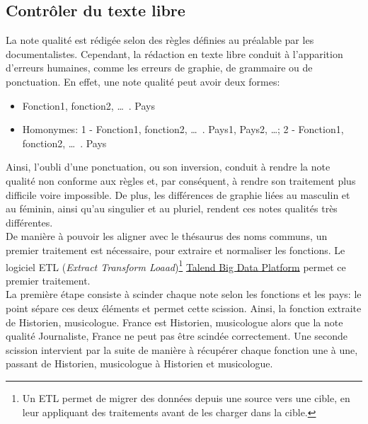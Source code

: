 \subsection{\label{I-C-3-a}Contrôler du texte libre}

La note qualité est rédigée selon des règles définies au préalable par les documentalistes. Cependant, la rédaction en texte libre conduit à l'apparition d'erreurs humaines, comme les erreurs de graphie, de grammaire ou de ponctuation. En effet, une note qualité peut avoir deux formes:
\begin{itemize}
	\item Fonction1, fonction2, \dots~. Pays
	\item Homonymes: 1 - Fonction1, fonction2, \dots~. Pays1, Pays2, \dots; 2 - Fonction1, fonction2, \dots~. Pays 
\end{itemize}
Ainsi, l'oubli d'une ponctuation, ou son inversion, conduit à rendre la note qualité non conforme aux règles et, par conséquent, à rendre son traitement plus difficile voire impossible. De plus, les différences de graphie liées au masculin et au féminin, ainsi qu'au singulier et au pluriel, rendent ces notes qualités très différentes.\\

De manière à pouvoir les aligner avec le thésaurus des noms communs, un premier traitement est nécessaire, pour extraire et normaliser les fonctions. Le logiciel ETL (\textit{Extract Transform Loaad})\footnote{Un ETL permet de migrer des données depuis une source vers une cible, en leur appliquant des traitements avant de les charger dans la cible.} \href{https://www.talend.com/fr/products/big-data/}{Talend Big Data Platform} permet ce premier traitement.\\

La première étape consiste à scinder chaque note selon les fonctions et les pays: le point sépare ces deux éléments et permet cette scission. Ainsi, la fonction extraite de \og Historien, musicologue. France\fg{} est \og Historien, musicologue\fg{} alors que la note qualité \og Journaliste, France\fg{} ne peut pas être scindée correctement. Une seconde scission intervient par la suite de manière à récupérer chaque fonction une à une, passant de \og Historien, musicologue\fg{} à \og Historien\fg{} et \og musicologue\fg{}.\\

